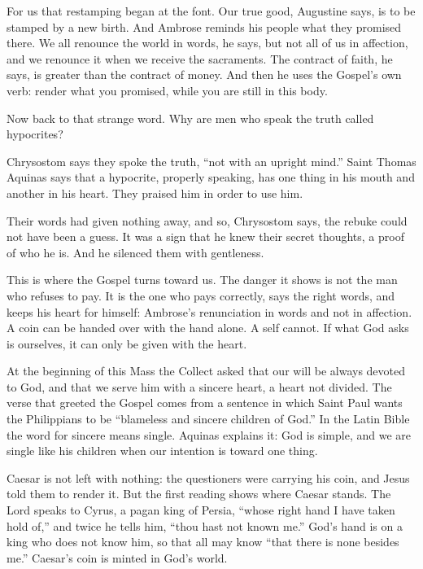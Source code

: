 For us that restamping began at the font. Our true good, Augustine says, is to
be stamped by a new birth. And Ambrose reminds his people what they
promised there. We all renounce the world in words, he says, but not all of us
in affection, and we renounce it when we receive the sacraments. The contract
of faith, he says, is greater than the contract of money. And then he uses the
Gospel's own verb: render what you promised, while you are still in this body.

\bigskip

Now back to that strange word. Why are men who speak the truth called
hypocrites?

Chrysostom says they spoke the truth, ``not with an upright mind.'' Saint
Thomas Aquinas says that a hypocrite, properly speaking, has one thing in his
mouth and another in his heart. They praised him in order to use him.

Their words had given nothing away, and so, Chrysostom says, the rebuke could
not have been a guess. It was a sign that he knew their secret thoughts, a
proof of who he is. And he silenced them with gentleness.

This is where the Gospel turns toward us. The danger it shows is not the man
who refuses to pay. It is the one who pays correctly, says the right words,
and keeps his heart for himself: Ambrose's renunciation in words and not in
affection. A coin can be handed over with the hand alone. A self cannot. If
what God asks is ourselves, it can only be given with the heart.

At the beginning of this Mass the Collect asked that our will be always
devoted to God, and that we serve him with a sincere heart, a heart not
divided. The verse that greeted the Gospel comes from a sentence in which
Saint Paul wants the Philippians to be ``blameless and sincere children of
God.'' In the Latin Bible the word for sincere means single. Aquinas explains
it: God is simple, and we are single like his children when our intention is
toward one thing.

\bigskip

Caesar is not left with nothing: the questioners were carrying his coin, and
Jesus told them to render it. But the first reading shows where Caesar stands. The Lord
speaks to Cyrus, a pagan king of Persia, ``whose right hand I have taken hold
of,'' and twice he tells him, ``thou hast not known me.'' God's hand is on a
king who does not know him, so that all may know ``that there is none besides
me.'' Caesar's coin is minted in God's world.

